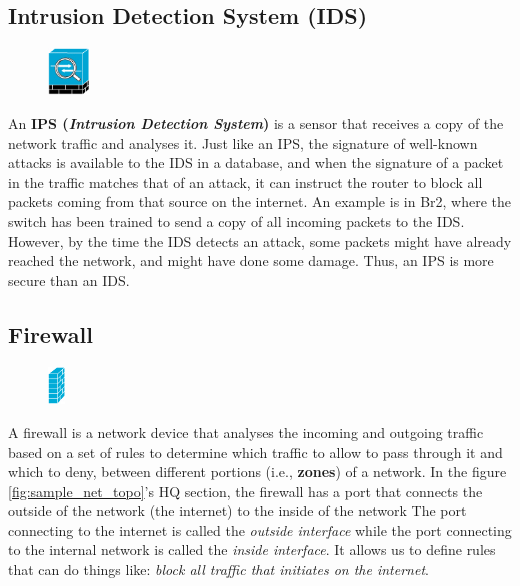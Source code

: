\subsection{Intrusion Detection System (IDS)}
\begin{figure}
	\centering
	\vspace{-10pt}
	\includegraphics[width=0.1\textwidth]{"Mod1/chapters/1.2.b Network Icons/1.2.b.6 IPS"}
	\vspace{-10pt}
\end{figure}
An \textbf{IPS (\textit{Intrusion Detection System})} is a sensor that receives a copy of the network traffic and analyses it. Just like an IPS, the signature of well-known attacks is available to the IDS in a database, and when the signature of a packet in the traffic matches that of an attack, it can instruct the router to block all packets coming from that source on the internet. An example is in Br2, where the switch has been trained to send a copy of all incoming packets to the IDS. However, by the time the IDS detects an attack, some packets might have already reached the network, and might have done some damage. Thus, an IPS is more secure than an IDS. 

\subsection{Firewall}
\begin{figure}
	\centering
	\vspace{-10pt}
	\includegraphics[width=0.04\textwidth]{"Mod1/chapters/1.2.b Network Icons/1.2.b.7 Firewall"}
	\vspace{-10pt}
\end{figure}
A firewall is a network device that analyses the incoming and outgoing traffic based on a set of rules to determine which traffic to allow to pass through it and which to deny, between different portions (i.e., \textbf{zones}) of a network. In the figure \ref{fig:sample_net_topo}'s HQ section, the firewall has a port that connects the outside of the network (the internet) to the inside of the network The port connecting to the internet is called the \textit{outside interface} while the port connecting to the internal network is called the \textit{inside interface}. It allows us to define rules that can do things like: \textit{block all traffic that initiates on the internet}. 

